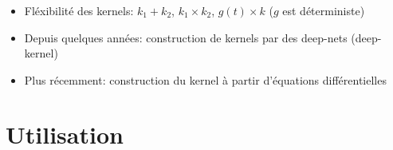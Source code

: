 \documentclass[xcolor=svgnames, t]{beamer}
\begin{document}
\begin{frame}
  \frametitle{\secname}
  \begin{itemize}
    \item Fléxibilité des kernels: $k_1 + k_2$, $k_1 \times k_2$, $g(t) \times k$ ($g$ est déterministe)
  \pause
    \item Depuis quelques années: construction de kernels par des deep-nets (deep-kernel)
  \pause
    \item Plus récemment: construction du kernel à  partir d'équations différentielles
  \end{itemize}
\end{frame}

\section{Utilisation}

\end{document}
